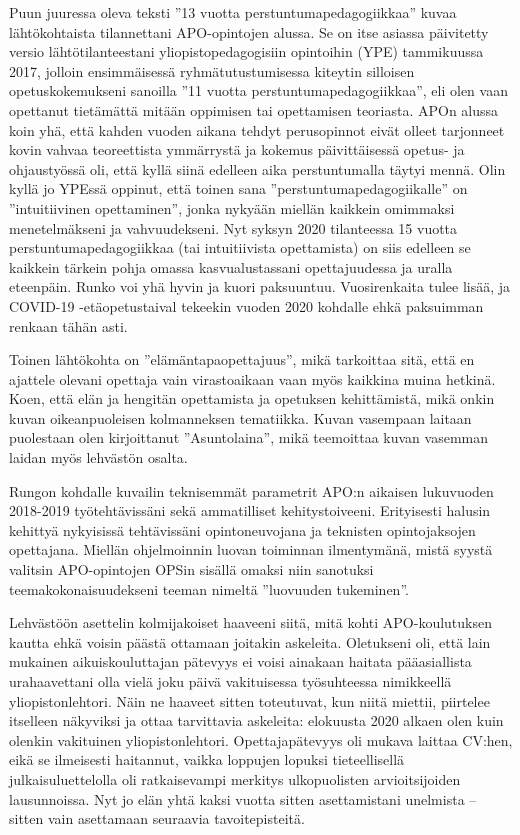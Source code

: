 \documentclass[utf8]{gradu3}
\begin{document}
Puun juuressa oleva teksti ''13 vuotta perstuntumapedagogiikkaa'' kuvaa
lähtökohtaista tilannettani APO-opintojen alussa. Se on itse asiassa päivitetty
versio lähtötilanteestani yliopistopedagogisiin opintoihin (YPE) tammikuussa
2017, jolloin ensimmäisessä ryhmätutustumisessa kiteytin silloisen
opetuskokemukseni sanoilla ''11 vuotta perstuntumapedagogiikkaa'', eli olen vaan
opettanut tietämättä mitään oppimisen tai opettamisen teoriasta. APOn alussa
koin yhä, että kahden vuoden aikana tehdyt perusopinnot eivät olleet tarjonneet
kovin vahvaa teoreettista ymmärrystä ja kokemus päivittäisessä opetus- ja
ohjaustyössä oli, että kyllä siinä edelleen aika perstuntumalla täytyi mennä.
Olin kyllä jo YPEssä oppinut, että toinen sana ''perstuntumapedagogiikalle'' on
''intuitiivinen opettaminen'', jonka nykyään miellän kaikkein omimmaksi
menetelmäkseni ja vahvuudekseni. Nyt syksyn 2020 tilanteessa 15 vuotta
perstuntumapedagogiikkaa (tai intuitiivista opettamista) on siis edelleen se
kaikkein tärkein pohja omassa kasvualustassani opettajuudessa ja uralla
eteenpäin. Runko voi yhä hyvin ja kuori paksuuntuu. Vuosirenkaita tulee lisää,
ja COVID-19 -etäopetustaival tekeekin vuoden 2020 kohdalle ehkä paksuimman
renkaan tähän asti.

Toinen lähtökohta on ''elämäntapaopettajuus'', mikä tarkoittaa sitä, että en
ajattele olevani opettaja vain virastoaikaan vaan myös kaikkina muina hetkinä.
Koen, että elän ja hengitän opettamista ja opetuksen kehittämistä, mikä onkin
kuvan oikeanpuoleisen kolmanneksen tematiikka. Kuvan vasempaan laitaan
puolestaan olen kirjoittanut ''Asuntolaina'', mikä teemoittaa kuvan vasemman
laidan myös lehvästön osalta.

Rungon kohdalle kuvailin teknisemmät parametrit APO:n aikaisen lukuvuoden
2018-2019 työtehtävissäni sekä ammatilliset kehitystoiveeni. Erityisesti halusin
kehittyä nykyisissä tehtävissäni opintoneuvojana ja teknisten opintojaksojen
opettajana. Miellän ohjelmoinnin luovan toiminnan ilmentymänä, mistä syystä
valitsin APO-opintojen OPSin sisällä omaksi niin sanotuksi
teemakokonaisuudekseni teeman nimeltä ''luovuuden tukeminen''.

Lehvästöön asettelin kolmijakoiset haaveeni siitä, mitä kohti APO-koulutuksen
kautta ehkä voisin päästä ottamaan joitakin askeleita. Oletukseni oli, että lain
mukainen aikuiskouluttajan pätevyys ei voisi ainakaan haitata pääasiallista
urahaavettani olla vielä joku päivä vakituisessa työsuhteessa nimikkeellä
yliopistonlehtori. Näin ne haaveet sitten toteutuvat, kun niitä miettii,
piirtelee itselleen näkyviksi ja ottaa tarvittavia askeleita: elokuusta 2020
alkaen olen kuin olenkin vakituinen yliopistonlehtori. Opettajapätevyys oli
mukava laittaa CV:hen, eikä se ilmeisesti haitannut, vaikka loppujen lopuksi
tieteellisellä julkaisuluettelolla oli ratkaisevampi merkitys ulkopuolisten
arvioitsijoiden lausunnoissa. Nyt jo elän yhtä kaksi vuotta sitten asettamistani
unelmista -- sitten vain asettamaan seuraavia tavoitepisteitä.
\end{document}
